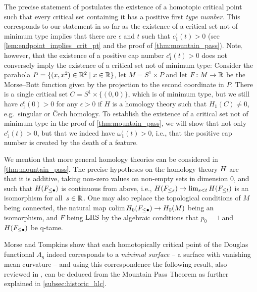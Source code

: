 \begin{rem}\label{rem:mountain_pass_conclusion}
    The precise statement of \cite[Corollary 7.1]{Morse.1939} postulates the existence of a homotopic critical point such that every critical set containing it has a positive first \emph{type number}.
    This corresponds to our statement in so far as the existence of a critical set not of minimum type implies that there are $\epsilon$ and $t$ such that $c_{1}^{\epsilon}(t) > 0$ (see \cref{lem:endpoint_implies_crit_pt} and the proof of \cref{thm:mountain_pass}).
    Note, however, that the existence of a positive cap number $c_{1}^{\epsilon}(t) > 0$ does not conversely imply the existence of a critical set not of minimum type:
    Consider the parabola $P = \{(x,x^2) \in \mathbb{R}^2 \mid x \in \mathbb{R}\}$, let $M = S^1 \times P$ and let $F \colon M \to \mathbb{R}$ be the Morse--Bott function given by the projection to the second coordinate in $P$.
    There is a single critical set $C = S^1 \times \{(0,0)\}$, which is of minimum type, but we still have $c_{1}^{\epsilon}(0) > 0$ for any $\epsilon > 0$ if $H$ is a homology theory such that $H_1(C) \neq 0$, e.g.\ singular or \v{C}ech homology.
    To establish the existence of a critical set not of minimum type in the proof of \cref{thm:mountain_pass}, we will show that not only $c_{1}^{\epsilon}(t) > 0$, but that we indeed have $\omega_1^{\epsilon}(t) > 0$, i.e., that the positive cap number is created by the death of a feature.
\end{rem}

\begin{rem}
	We mention that more general homology theories can be considered in \cref{thm:mountain_pass}.
	The precise hypotheses on the homology theory $H$ are that it is additive, taking non-zero values on non-empty sets in dimension $0$, and such that $H(F_{\leq \bullet})$ is continuous from above, i.e., $H(F_{\leq s}) \to \lim_{s < t} H(F_{\leq t})$ is an isomorphism for all~$s \in \mathbb{R}$.
	One may also replace the topological conditions of $M$ being connected, the natural map $\operatorname*{colim} H_0(F_{\leq \bullet}) \to H_0(M)$ being an isomorphism, and $F$ being $\mathrm{LHS}$ by the algebraic conditions that $p_0 = 1$ and $H(F_{\leq \bullet})$ be q-tame.
\end{rem}

Morse and Tompkins show \cite[Theorem 6.2]{Morse.1939} that each homotopically critical point of the Douglas functional $A_g$ indeed corresponds to
%
a \emph{minimal surface} -- a surface with vanishing mean curvature -- and using this correspondence the following result, also reviewed in \cite[Theorem II.6.10]{Struwe.1988}, can be deduced from the Mountain Pass Theorem as further explained in \cref{subsec:historic_hlc}.

